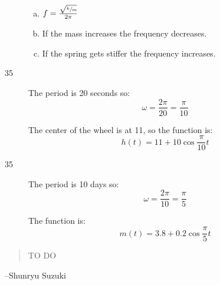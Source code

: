 \documentclass{exam}
\begin{document}
\begin{description}
\begin{enumerate}[(a)]
          \item $f = \frac{ \sqrt{\sfrac{k}{m}} }{2 \pi}$

          \item If the mass increases the frequency decreases.

          \item If the spring gets stiffer the frequency increases.

        \end{enumerate}

      \item[35] The period is 20 seconds so: 
        \[
          \omega = \frac{2 \pi}{20} = \frac{\pi}{10}
        \]

        The center of the wheel is at 11, so the function is:
        \[
          \boxed{ h(t) = 11 + 10 \cos \frac{\pi}{10} t }
        \]

      \item[35] The period is 10 days so: 
        \[
          \omega = \frac{2 \pi}{10} = \frac{\pi}{5}
        \]

        The function is:
        \[
          \boxed{ m(t) = 3.8 + 0.2 \cos \frac{\pi}{5} t }
        \]


    \end{description}

  \else
    \vspace{1 cm}
    \begin{quote}
      \begin{em}
        TO DO
      \end{em}
    \end{quote}
    \hspace{1 cm} --Shunryu Suzuki
  \fi
\end{document}
